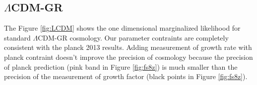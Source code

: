 \subsection{$\Lambda$CDM-GR}
The Figure \ref{fig:LCDM} shows the one dimensional marginalized likelihood for standard $\Lambda$CDM-GR cosmology. Our parameter contraints are completely consistent with the planck 2013 results. Adding measurement of growth rate with planck contraint doesn't improve the precision of cosmology because the precision of planck prediction (pink band in Figure \ref{fig:fs8z})  is much smaller than the precision of the measurement of growth factor (black points in Figure \ref{fig:fs8z}). 


